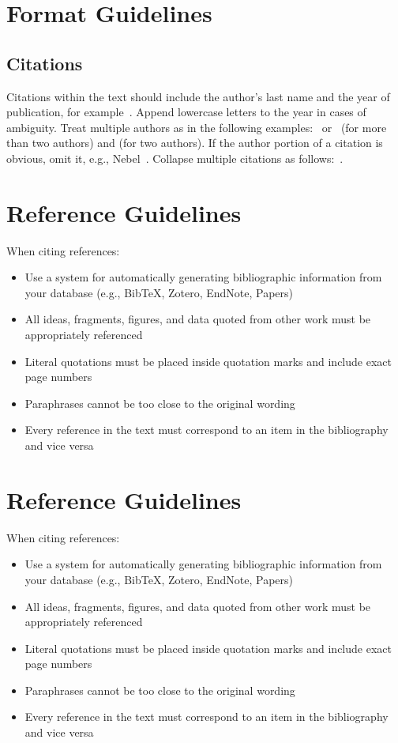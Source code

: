 \appendix

\section{Format Guidelines}

\subsection{Citations}
Citations within the text should include the author's last name and the year of publication, for example~\cite{example4}. Append lowercase letters to the year in cases of ambiguity. Treat multiple authors as in the following examples:~\cite{example1} or~\cite{example2} (for more than two authors) and \cite{example3} (for two authors). If the author portion of a citation is obvious, omit it, e.g., Nebel~. Collapse multiple citations as follows:~\cite{example5,example6}.

\section{Reference Guidelines}
When citing references:
\begin{itemize}
\item Use a system for automatically generating bibliographic information from your database (e.g., BibTeX, Zotero, EndNote, Papers)
\item All ideas, fragments, figures, and data quoted from other work must be appropriately referenced
\item Literal quotations must be placed inside quotation marks and include exact page numbers
\item Paraphrases cannot be too close to the original wording
\item Every reference in the text must correspond to an item in the bibliography and vice versa
\end{itemize}

\section{Reference Guidelines}
When citing references:
\begin{itemize}
\item Use a system for automatically generating bibliographic information from your database (e.g., BibTeX, Zotero, EndNote, Papers)
\item All ideas, fragments, figures, and data quoted from other work must be appropriately referenced
\item Literal quotations must be placed inside quotation marks and include exact page numbers
\item Paraphrases cannot be too close to the original wording
\item Every reference in the text must correspond to an item in the bibliography and vice versa
\end{itemize}

